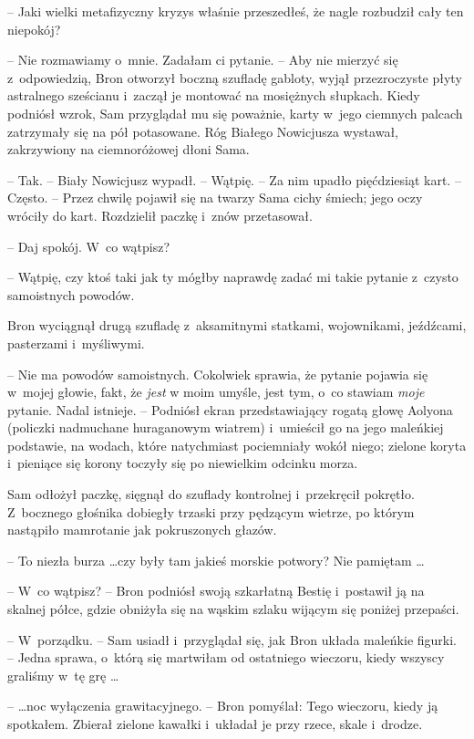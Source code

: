 \documentclass[oneside,polish,11pt,rmheadings]{mwbk}
\begin{document}
-- Jaki wielki metafizyczny kryzys właśnie przeszedłeś, że nagle rozbudził cały ten niepokój?  

-- Nie rozmawiamy o~mnie. Zadałam ci pytanie. -- Aby nie mierzyć się z~odpowiedzią, Bron otworzył boczną szufladę gabloty, wyjął przezroczyste płyty astralnego sześcianu i~zaczął je montować na mosiężnych słupkach. Kiedy podniósł wzrok, Sam przyglądał mu się poważnie, karty w~jego ciemnych palcach zatrzymały się na pół potasowane. Róg Białego Nowicjusza wystawał, zakrzywiony na ciemnoróżowej dłoni Sama. 

-- Tak. --  Biały Nowicjusz wypadł. -- Wątpię. --  Za nim upadło pięćdziesiąt kart. -- Często. --  Przez chwilę pojawił się na twarzy Sama cichy śmiech; jego oczy wróciły do kart. Rozdzielił paczkę i~znów przetasował. 

-- Daj spokój. W~co wątpisz? 

-- Wątpię, czy ktoś taki jak ty mógłby naprawdę zadać mi takie pytanie z~czysto samoistnych powodów. 

Bron wyciągnął drugą szufladę z~aksamitnymi statkami, wojownikami, jeźdźcami, pasterzami i~myśliwymi. 

-- Nie ma powodów samoistnych. Cokolwiek sprawia, że pytanie pojawia się w~mojej głowie, fakt, że \textit{jest }w moim umyśle, jest tym, o~co stawiam \textit{moje }pytanie. Nadal istnieje. -- Podniósł ekran przedstawiający rogatą głowę Aolyona (policzki nadmuchane huraganowym wiatrem) i~umieścił go na jego maleńkiej podstawie, na wodach, które natychmiast pociemniały wokół niego; zielone koryta i~pieniące się korony toczyły się po niewielkim odcinku morza. 

Sam odłożył paczkę, sięgnął do szuflady kontrolnej i~przekręcił pokrętło. Z~bocznego głośnika dobiegły trzaski przy pędzącym wietrze, po którym nastąpiło mamrotanie jak pokruszonych głazów. 

-- To niezła burza \ldots  czy były tam jakieś morskie potwory? Nie pamiętam \ldots  

-- W~co wątpisz? -- Bron podniósł swoją szkarłatną Bestię i~postawił ją na skalnej półce, gdzie obniżyła się na wąskim szlaku wijącym się poniżej przepaści. 

-- W~porządku. -- Sam usiadł i~przyglądał się, jak Bron układa maleńkie figurki. -- Jedna sprawa, o~którą się martwiłam od ostatniego wieczoru, kiedy wszyscy graliśmy w~tę grę \ldots  

--  \ldots noc wyłączenia grawitacyjnego. --  Bron pomyślał: Tego wieczoru, kiedy ją spotkałem. Zbierał zielone kawałki i~układał je przy rzece, skale i~drodze. 
\end{document}

